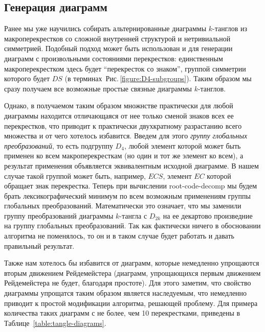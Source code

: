 \documentclass[12pt]{article}
\theoremstyle{plain}
\theoremstyle{definition}
\def\figureref#1{Рис.\,\protect\ref{#1}}
\def\RCD{\hbox{root-code-decomp}}
\begin{document}
	\subsection{Генерация диаграмм}

		Ранее мы уже научились собирать альтернированные диаграммы $k$-танглов из макроперекрестков со сложной внутренней структурой и
		нетривиальной симметрией. Подобный подход может быть использован и для генерации диаграмм с произвольными состояниями перекрестков:
		единственным макроперекрестком здесь будет ``перекресток со знаком'', группой симметрии которого будет $DS$ (в
		терминах~\figureref{figure:D4-subgroups}). Таким образом мы сразу получаем все возможные простые связные диаграммы $k$-танглов.

		Однако, в получаемом таким образом множнстве практически для любой диаграммы находится отличающаяся от нее только сменой знаков
		всех ее перекрестков, что приводит к практически двухкратному разрастанию всего множества и от чего хотелось избавится. Введем
		для этого \textit{группу глобальных преобразований}, то есть подгруппу $D_4$, любой элемент которой может быть применен ко всем
		макроперекресткам (но один и тот же элемент ко всем), а результат применения объявляется эквивалентным исходной диаграмме. В нашем
		случае такой группой может быть, например, $ECS$, элемент $EC$ которой обращает знак перекрестка. Теперь при вычислении \RCD{} мы
		будем брать лексикографический минимум по всем возможным применениям группы глобальных преобразований. Математически это означает,
		что мы заменили группу преобразований диаграммы $k$-тангла с $D_{2k}$ на ее декартово произведние на группу глобальных преобразований.
		Так как фактически ничего в обосновании алгоритма не поменялось, то он и в таком случае будет работать и давать правильный результат.

		Также нам хотелось бы избавится от диаграмм, которые немедленно упрощаются вторым движением Рейдемейстера (диаграмм, упрощающихся
		первым движением Рейдемейстера не будет, благодаря простоте). Для этого заметим, что свойство диаграммы упрощатся таким образом
		является наследуемым, что немедленно приводит к простой модификации алгоритма, решающей проблему. Для примера количества таких
		диаграмм с не более, чем 10 перекрестками, приведены в Таблице~\ref{table:tangle-diagrams}.
\end{document}

